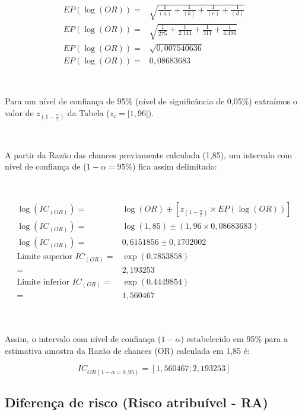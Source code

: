 \documentclass[
]{book}
\begin{document}
~

\begin{align*}
EP(\log(OR)) = & \sqrt{  \frac{1}{(a)} + \frac{1}{(b)} + \frac{1}{(c)} +\frac{1}{(d)}  } \\
EP(\log(OR)) = & \sqrt{  \frac{1}{275} + \frac{1}{2.144} + \frac{1}{311} +\frac{1}{4.496} }\\
EP(\log(OR)) = & \sqrt{ 0,007540636}\\
EP(\log(OR)) = & 0,08683683
\end{align*}

~

Para um nível de confiança de 95\% (nível de significância de 0,05\%) extraímos o valor de \(z_{(1-\frac{\alpha}{2})}\) da Tabela (\(z_{c}=|1,96|\)).

~

A partir da Razão das chances previamente calculada (1,85), um intervalo com nível de confiança de (\(1-\alpha=95\%\)) fica assim delimitado:

~

\begin{align*}
\log(IC_{(OR)}) = & \log(OR) \pm \left[ z_{(1-\frac{\alpha}{2})} \times EP(\log(OR))\right] \\
\log(IC_{(OR)}) = & \log(1,85) \pm \left(1,96 \times 0,08683683 \right) \\
\log(IC_{(OR)}) = & 0,6151856 \pm 0,1702002  \\
\text{Limite superior } IC_{(OR)} = & \exp{( 0.7853858)}\\
                                  = & 2,193253 \\
\text{Limite inferior } IC_{(OR)} = & \exp{(0.4449854)} \\
                                  = & 1,560467 \\
\end{align*}

~

Assim, o intervalo com nível de confiança (\(1-\alpha\)) estabelecido em 95\% para a estimativa amostra da Razão de chances (OR) calculada em 1,85 é:

\hfill\break

\[
IC_{OR (1-\alpha=0,95)} = [1, 560467 ; 2, 193253]
\]

\hfill\break

\hypertarget{diferenuxe7a-de-risco-risco-atribuuxedvel---ra-1}{%
\subsection{Diferença de risco (Risco atribuível - RA)}\label{diferenuxe7a-de-risco-risco-atribuuxedvel---ra-1}}
\end{document}
